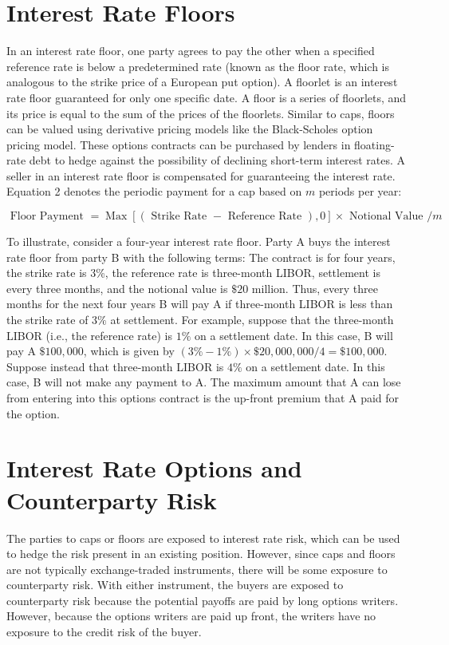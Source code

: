 \documentclass[11pt]{article}
\begin{document}
\section*{Interest Rate Floors}
In an interest rate floor, one party agrees to pay the other when a specified reference rate is below a predetermined rate (known as the floor rate, which is analogous to the strike price of a European put option). A floorlet is an interest rate floor guaranteed for only one specific date. A floor is a series of floorlets, and its price is equal to the sum of the prices of the floorlets. Similar to caps, floors can be valued using derivative pricing models like the Black-Scholes option pricing model. These options contracts can be purchased by lenders in floating-rate debt to hedge against the possibility of declining short-term interest rates. A seller in an interest rate floor is compensated for guaranteeing the interest rate. Equation 2 denotes the periodic payment for a cap based on $m$ periods per year:


\begin{equation*}
\text { Floor Payment }=\operatorname{Max}[(\text { Strike Rate }- \text { Reference Rate }), 0] \times \text { Notional Value } / m \tag{2}
\end{equation*}


To illustrate, consider a four-year interest rate floor. Party A buys the interest rate floor from party B with the following terms: The contract is for four years, the strike rate is 3\%, the reference rate is three-month LIBOR, settlement is every three months, and the notional value is $\$ 20$ million. Thus, every three months for the next four years B will pay A if three-month LIBOR is less than the strike rate of $3 \%$ at settlement. For example, suppose that the three-month LIBOR (i.e., the reference rate) is $1 \%$ on a settlement date. In this case, B will pay A $\$ 100,000$, which is given by $(3 \%-1 \%) \times \$ 20,000,000 / 4=\$ 100,000$. Suppose instead that three-month LIBOR is $4 \%$ on a settlement date. In this case, B will not make any payment to A. The maximum amount that A can lose from entering into this options contract is the up-front premium that A paid for the option.

\section*{Interest Rate Options and Counterparty Risk}
The parties to caps or floors are exposed to interest rate risk, which can be used to hedge the risk present in an existing position. However, since caps and floors are not typically exchange-traded instruments, there will be some exposure to counterparty risk. With either instrument, the buyers are exposed to counterparty risk because the potential payoffs are paid by long options writers. However, because the options writers are paid up front, the writers have no exposure to the credit risk of the buyer.
\end{document}

